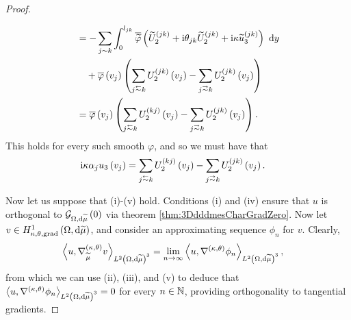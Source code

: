 \begin{proof}
\begin{enumerate}[(i)]
\begin{align*}
			&= - \sum_{j\con k}\int_0^{l_{jk}} \overline{\widetilde{\varphi}}\bracs{ \widetilde{U}_2^{(jk)} + \rmi\qm_{jk}\widetilde{U}_2^{(jk)} + \rmi\wavenumber\widetilde{u}_3^{(jk)} } \ \md y \\
			&\quad + \overline{\varphi}\bracs{v_j}\bracs{ \sum_{j\conRight k} U_2^{(jk)}\bracs{v_j} - \sum_{j\conLeft k} U_2^{(jk)}\bracs{v_j} } \\
			&= \overline{\varphi}\bracs{v_j}\bracs{ \sum_{j\conRight k} U_2^{(kj)}\bracs{v_j} - \sum_{j\conLeft k} U_2^{(jk)}\bracs{v_j} }.
		\end{align*}
		This holds for every such smooth $\varphi$, and so we must have that
		\begin{align*}
			\rmi\wavenumber\alpha_j u_3\bracs{v_j} &= \sum_{j\conRight k} U_2^{(kj)}\bracs{v_j} - \sum_{j\conLeft k} U_2^{(jk)}\bracs{v_j}.
		\end{align*}
	\end{enumerate}
	
	Now let us suppose that (i)-(v) hold.
	Conditions (i) and (iv) ensure that $u$ is orthogonal to $\mathcal{G}_{ \Omega, \mathrm{d}\widetilde{\mu}}\left( 0 \right)$ via theorem \ref{thm:3DdddmesCharGradZero}.
	Now let $v\in H^1_{\kappa,\theta,\mathrm{grad}}\left( \Omega, \mathrm{d}\widetilde{\mu} \right)$, and consider an approximating sequence $\phi_n$ for $v$.
	Clearly,
	\begin{align*}
		\left\langle u , \nabla^{\left( \kappa, \theta \right)}_{\widetilde{\mu}}v \right\rangle_{L^{2}\left( \Omega,\mathrm{d} \widetilde{\mu} \right)^3}
		&= \lim_{n\rightarrow\infty}\left\langle u , \nabla^{\left( \kappa, \theta \right)}\phi_n \right\rangle_{L^{2}\left( \Omega,\mathrm{d} \widetilde{\mu} \right)^3},
	\end{align*}
	from which we can use (ii), (iii), and (v) to deduce that $\left\langle u , \nabla^{\left( \kappa, \theta \right)}\phi_n \right\rangle_{L^{2}\left( \Omega,\mathrm{d} \widetilde{\mu} \right)^3}=0$ for every $n\in\mathbb{N}$, providing orthogonality to tangential gradients.
\end{proof}